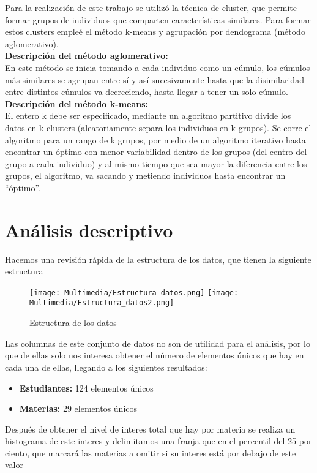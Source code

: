 \documentclass[12pt]{article}
\begin{document}
Para la realización de este trabajo se utilizó la técnica de cluster, que permite formar grupos de individuos que comparten características
similares. Para formar estos clusters empleé el método k-means y agrupación por dendograma (método aglomerativo).\\
\textbf{Descripción del método aglomerativo:}\\
En este método se inicia tomando a cada individuo como un cúmulo, los
cúmulos más similares se agrupan entre sí y así sucesivamente hasta que la
disimilaridad entre distintos cúmulos va decreciendo, hasta llegar a tener un solo
cúmulo.\\
\textbf{Descripción del método k-means:}\\
El entero k debe ser especificado, mediante un algoritmo partitivo divide los datos
en k clusters (aleatoriamente separa los individuos en k grupos). Se corre el
algoritmo para un rango de k grupos, por medio de un algoritmo iterativo hasta
encontrar un óptimo con menor variabilidad dentro de los grupos (del centro del grupo a cada individuo)
y al mismo tiempo que sea mayor la diferencia entre los grupos, el algoritmo, va sacando y metiendo individuos hasta encontrar un
“óptimo”.

\newpage

\section{Análisis descriptivo}

Hacemos una revisión rápida de la estructura de los datos, que tienen la siguiente estructura
\begin{figure}[H]
\centering
\texttt{[image: Multimedia/Estructura\_datos.png]}
\texttt{[image: Multimedia/Estructura\_datos2.png]}
\caption{Estructura de los datos}
\end{figure}

Las columnas de este conjunto de datos no son de utilidad para el análisis, por lo que de ellas solo nos interesa obtener el número de
elementos únicos que hay en cada una de ellas, llegando a los siguientes resultados:
\begin{itemize}
    \item \textbf{Estudiantes:} 124 elementos únicos
    \item \textbf{Materias:} 29 elementos únicos
\end{itemize}

Después de obtener el nivel de interes total que hay por materia se realiza un histograma de este interes y delimitamos una franja que en
el percentil del 25 por ciento, que marcará las materias a omitir si su interes está por debajo de este valor
\end{document}
